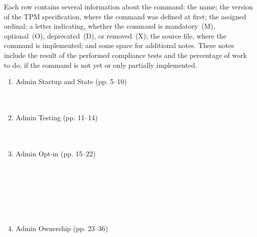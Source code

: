 \documentclass[runningheads]{llncs}
\begin{document}
Each row contains several information about the command:
the name;
the version of the TPM specification, where the command was defined at first;
the assigned ordinal;
a letter indicating, whether the command is mandatory~(M), optional~(O),
deprecated~(D), or removed~(X);
the source file, where the command is implemented;
and some space for additional notes.
These notes include the result of the performed compliance tests and the
percentage of work to do, if the command is not yet or only partially
implemented.


\begin{enumerate}
	\item Admin Startup and State (pp. 5--10)\\
\\
\\
	\item Admin Testing (pp. 11--14)\\
\\
\\
	\item Admin Opt-in (pp. 15--22)\\
\\
\\
\\
\\
\\
\\
	\item Admin Ownership (pp. 23--36)\\
\\
\\
\\

\end{enumerate}
\end{document}
